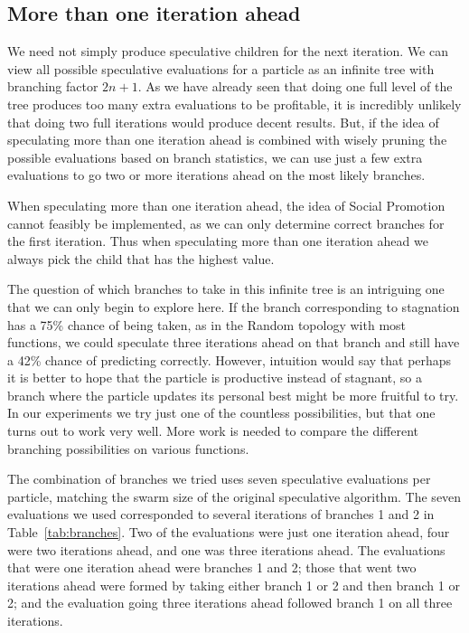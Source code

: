 \documentclass[journal,letterpaper]{IEEEtran}
\begin{document}
\subsection{More than one iteration ahead}
\label{sec:manyiters}

We need not simply produce speculative children for the next iteration.  We can
view all possible speculative evaluations for a particle as an infinite tree
with branching factor $2n+1$.  As we have already seen that doing one full
level of the tree produces too many extra evaluations to be profitable, it is
incredibly unlikely that doing two full iterations would produce decent
results.  But, if the idea of speculating more than one iteration ahead is
combined with wisely pruning the possible evaluations based on branch
statistics, we can use just a few extra evaluations to go two or more
iterations ahead on the most likely branches.

When speculating more than one iteration ahead, the idea of Social Promotion
cannot feasibly be implemented, as we can only determine correct branches for
the first iteration.  Thus when speculating more than one iteration ahead we
always pick the child that has the highest value.

The question of which branches to take in this infinite tree is an intriguing
one that we can only begin to explore here.  If the branch corresponding to
stagnation has a 75\% chance of being taken, as in the Random topology with
most functions, we could speculate three iterations ahead on that branch and
still have a 42\% chance of predicting correctly.  However, intuition would say
that perhaps it is better to hope that the particle is productive instead of
stagnant, so a branch where the particle updates its personal best might be
more fruitful to try.  In our experiments we try just one of the countless
possibilities, but that one turns out to work very well.  More work is needed
to compare the different branching possibilities on various functions.

The combination of branches we tried uses seven speculative evaluations per
particle, matching the swarm size of the original speculative algorithm.  The
seven evaluations we used corresponded to several iterations of branches 1 and
2 in Table~\ref{tab:branches}.  Two of the evaluations were just one iteration
ahead, four were two iterations ahead, and one was three iterations ahead.  The
evaluations that were one iteration ahead were branches 1 and 2; those that
went two iterations ahead were formed by taking either branch 1 or 2 and then
branch 1 or 2; and the evaluation going three iterations ahead followed branch
1 on all three iterations.
\end{document}
